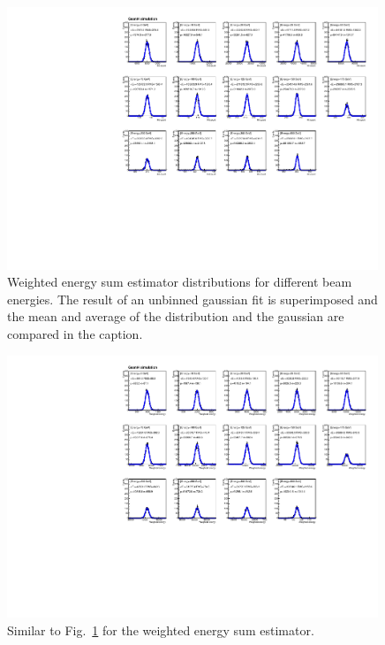 \begin{figure}[h!]
  \begin{center}
    \includegraphics[width=0.99\textwidth]{figures/recenergy_nemHits}
    \caption{Weighted energy sum estimator distributions for different
    beam energies. The result of an unbinned gaussian fit is
    superimposed and the mean and average of the distribution and the
    gaussian are compared in the caption.}
    \label{fig:fithitcount}
  \end{center}
\end{figure}

\begin{figure}[h!]
  \begin{center}
    \includegraphics[width=0.99\textwidth]{figures/recenergy_sumWEn}
    \caption{Similar to Fig.~\ref{fig:fithitcount} for the weighted energy sum estimator.}
    \label{fig:fitwen}
  \end{center}
\end{figure}

